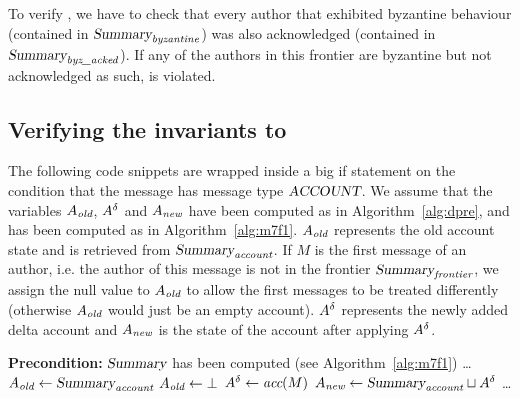 To verify , we have to check that every author that exhibited byzantine behaviour (contained in $\textsl{Summary}_\emph{byzantine}$) was also acknowledged (contained in $\textsl{Summary}_\emph{byz\_acked}$). If any of the authors in this frontier are byzantine but not acknowledged as such,  is violated.


\subsection{Verifying the invariants  to }
\label{sec:delta-invariant-checks}

The following code snippets are wrapped inside a big if statement on the condition that the message has message type $\textsl{ACCOUNT}$. We assume that the variables $A_\emph{old}$, $A^\delta$ and $A_\emph{new}$ have been computed as in Algorithm~\ref{alg:dpre}, and  has been computed as in Algorithm~\ref{alg:m7f1}.
$A_\emph{old}$ represents the old account state and is retrieved from $\textsl{Summary}_\emph{account}$. If $M$ is the first message of an author, i.e. the author of this message is not in the frontier $\textsl{Summary}_\emph{frontier}$, we assign the null value to $A_\emph{old}$ to allow the first messages to be treated differently (otherwise $A_\emph{old}$ would just be an empty account).
$A^\delta$ represents the newly added delta account and $A_\emph{new}$ is the state of the account after applying $A^\delta$.

\begin{algorithm}[ht]
    \caption{Code snippet assigning relevant account states}
    \label{alg:dpre}
\begin{algorithmic}
    \Statex \textbf{Precondition:} $\textsl{Summary}$ has been computed (see Algorithm~\ref{alg:m7f1})
    \Statex \ldots \vphantom{I}
        \State $A_\emph{old} \gets \textsl{Summary}_\emph{account}$
    \Else
        \State $A_\emph{old} \gets \bot$
    \EndIf
    \State $A^\delta \gets \textit{acc}(M)$
    \State $A_\emph{new} \gets \textsl{Summary}_\emph{account} \sqcup A^\delta$
    \Statex \ldots \vphantom{I}
\end{algorithmic}
\end{algorithm}

